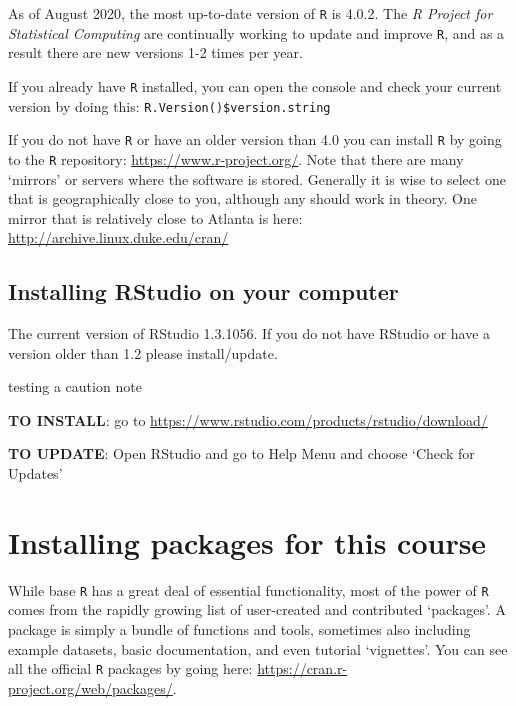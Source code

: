 \documentclass[
]{book}
\newenvironment{rmdcaution}[1]
  {
  \begin{itemize}
  \renewcommand{\labelitemi}{
    \raisebox{-.7\height}[0pt][0pt]{
      {\setkeys{Gin}{width=3em,keepaspectratio}\texttt{[image: images/\#1]}}
    }
  }
  \setlength{\fboxsep}{1em}
  \begin{blackbox}
  \item
  }
  {
  \end{blackbox}
  \end{itemize}
  }
\begin{document}
As of August 2020, the most up-to-date version of \texttt{R} is 4.0.2. The \emph{R Project for Statistical Computing} are continually working to update and improve \texttt{R}, and as a result there are new versions 1-2 times per year.

If you already have \texttt{R} installed, you can open the console and check your current version by doing this: \texttt{R.Version()\$version.string}

If you do not have \texttt{R} or have an older version than 4.0 you can install \texttt{R} by going to the \texttt{R} repository: \url{https://www.r-project.org/}. Note that there are many `mirrors' or servers where the software is stored. Generally it is wise to select one that is geographically close to you, although any should work in theory. One mirror that is relatively close to Atlanta is here: \url{http://archive.linux.duke.edu/cran/}

\hypertarget{installing-rstudio-on-your-computer}{%
\section*{Installing RStudio on your computer}\label{installing-rstudio-on-your-computer}}

The current version of RStudio 1.3.1056. If you do not have RStudio or have a version older than 1.2 please install/update.

\begin{rmdcaution}{caution}
testing a caution note

\end{rmdcaution}

\textbf{TO INSTALL}: go to \url{https://www.rstudio.com/products/rstudio/download/}

\textbf{TO UPDATE}: Open RStudio and go to Help Menu and choose `Check for Updates'

\hypertarget{installing-packages-for-this-course}{%
\chapter*{Installing packages for this course}\label{installing-packages-for-this-course}}

While base \texttt{R} has a great deal of essential functionality, most of the power of \texttt{R} comes from the rapidly growing list of user-created and contributed `packages'. A package is simply a bundle of functions and tools, sometimes also including example datasets, basic documentation, and even tutorial `vignettes'. You can see all the official \texttt{R} packages by going here: \url{https://cran.r-project.org/web/packages/}.
\end{document}
